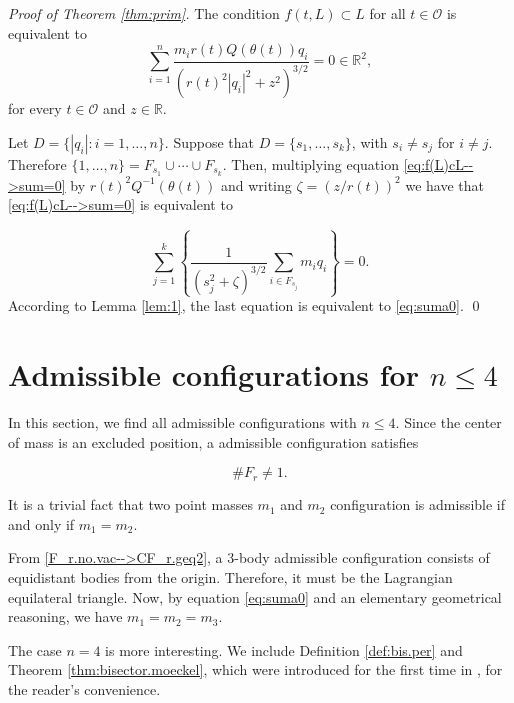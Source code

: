 \documentclass[smallcondensed]{svjour3}
\newcommand{\rr}{\mathbb{R}}
\begin{document}
\begin{proof}[Proof of Theorem \ref{thm:prim}]
The condition $f(t,L)\subset L$ for all $t\in\mathcal{O}$ is equivalent to
\begin{equation}\label{eq:f(L)cL-->sum=0}
 \sum_{i=1}^n\frac{m_ir(t)Q(\theta (t))q_i}{\left(r(t)^2|q_i|^2+z^2\right)^{3/2}}=0\in\rr^2,
\end{equation}
for every $t\in\mathcal{O}$ and $z\in \rr$.

Let $D=\{|q_i|: i=1,\ldots,n\}$.  Suppose that $D=\{s_1,\ldots,s_k\}$, with $s_i\neq s_j$ for $i\neq j$.  Therefore $\{1,\ldots,n\}=F_{s_1}\cup \cdots\cup F_{s_k}$. Then, multiplying equation \eqref{eq:f(L)cL-->sum=0} by $r(t)^2Q^{-1}(\theta(t))$  and writing $\zeta=(z/r(t))^2$ we have that \eqref{eq:f(L)cL-->sum=0} is equivalent to


\[\sum_{j=1}^k\left\{\frac{1}{(s_j^{2}+\zeta)^{3/2}}\sum_{i\in F_{s_j}}m_iq_i\right\}=0.\]
According to Lemma \ref{lem:1}, the last equation is equivalent to \eqref{eq:suma0}. \qed
\end{proof}


\section{Admissible  configurations for $n\leq 4$}\label{sec:addmisibles}


In this section, we find all admissible  configurations with $n\leq 4$.    Since the center of mass is an excluded position, a admissible configuration satisfies

\begin{equation}\label{F_r.no.vac-->CF_r.geq2}
  \# F_r\neq 1.
\end{equation}



It is a trivial fact that  two point masses $m_1$ and $m_2$ configuration is admissible if and only if $m_1=m_2$.


From \eqref{F_r.no.vac-->CF_r.geq2}, a $3$-body admissible  configuration consists of equidistant  bodies from the origin. Therefore, it must  be the Lagrangian equilateral triangle. Now, by equation \eqref{eq:suma0} and an elementary geometrical reasoning,   we have  $m_1=m_2=m_3$.



The case $n=4$ is more interesting. We include Definition \ref{def:bis.per} and Theorem \ref{thm:bisector.moeckel}, which were introduced  for the first time in  \cite{moeckel1990central}, for the reader's convenience.
\end{document}
